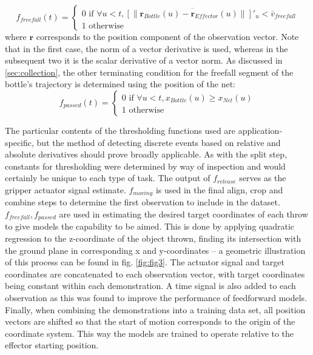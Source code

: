 \documentclass{article}
\begin{document}
\begin{equation}
    f_{freefall} (t) = \begin{cases}
        0 \text{ if } \forall u < t,  \overline{ \left [ \lVert  \boldsymbol{r}_{Bottle}(u) -  \boldsymbol{r}_{Effector}(u)  \rVert \right ] '_u} < \overline{v}_{freefall} \\
        1 \text{ otherwise }
    \end{cases}
\end{equation}
where $\boldsymbol{r}$ corresponds to the position component of the observation vector. Note that in the first case, the norm of a vector derivative is used, whereas in the subsequent two it is the scalar derivative of a vector norm. As discussed in \ref{sec:collection}, the other terminating condition for the freefall segment of the bottle's trajectory is determined using the position of the net:
\begin{equation}
    f_{passed} (t) = \begin{cases}
        0 \text{ if } \forall u < t, x_{Bottle}(u) \geq x_{Net}(u) \\
        1 \text{ otherwise }
    \end{cases}
\end{equation}

The particular contents of the thresholding functions used are application-specific, but the method of detecting discrete events based on relative and absolute derivatives should prove broadly applicable. As with the split step, constants for thresholding were determined by way of inspection and would certainly be unique to each type of task. The output of $f_{release}$ serves as the gripper actuator signal estimate. $f_{moving}$ is used in the final align, crop and combine steps to determine the first observation to include in the dataset. $f_{freefall}, f_{passed}$ are used in estimating the desired target coordinates of each throw to give models the capability to be aimed. This is done by applying quadratic regression to the z-coordinate of the object thrown, finding its intersection with the ground plane in corresponding x and y-coordinates -- a geometric illustration of this process can be found in fig. \ref{fig:fig3}. The actuator signal and target coordinates are concatenated to each observation vector, with target coordinates being constant within each demonstration. A time signal is also added to each observation as this was found to improve the performance of feedforward models. Finally, when combining the demonstrations into a training data set, all position vectors are shifted so that the start of motion corresponds to the origin of the coordinate system. This way the models are trained to operate relative to the effector starting position.
\end{document}
